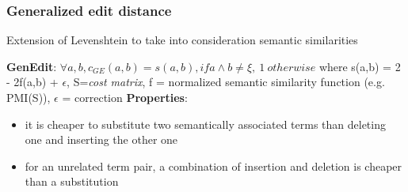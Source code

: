 \begin{frame}
	\frametitle{Generalized edit distance}
	\begin{block}
	{Extension of Levenshtein to take into consideration semantic similarities}
	\end{block}
	\textbf{GenEdit}:
$\forall a,b, c_{GE}(a,b)=s(a,b), if {{a}\wedge{b}}\neq{\xi},\ 1 \ otherwise$ where
s(a,b) = 2 - 2f(a,b) + $\epsilon$, S=\textit{cost matrix},\newline
f = normalized semantic similarity function (e.g. PMI(S)),\newline
$\epsilon$ = correction \newline
	\textbf{Properties}:
	\begin{itemize}
	\item it is cheaper to substitute two semantically associated terms than deleting one and inserting the other one
	\item for an unrelated term pair, a combination of insertion and deletion is cheaper than a substitution
 	\end{itemize}
\end{frame}
